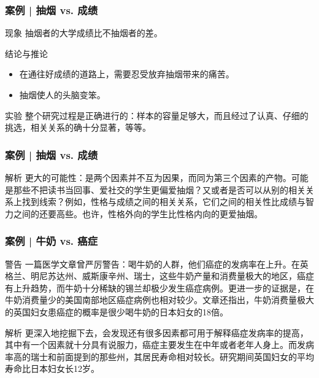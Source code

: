 \begin{frame}
  \frametitle{案例 | 抽烟 vs. 成绩}
  \begin{block}{现象}
    抽烟者的大学成绩比不抽烟者的差。
  \end{block}
  \pause
  \begin{block}{结论与推论}
    \begin{itemize}
      \item 在通往好成绩的道路上，需要忍受放弃抽烟带来的痛苦。
      \item 抽烟使人的头脑变笨。
    \end{itemize}
  \end{block}
  \pause
  \begin{block}{实验}
    整个研究过程是正确进行的：样本的容量足够大，而且经过了认真、仔细的挑选，相关关系的确十分显著，等等。
  \end{block}
\end{frame}

\begin{frame}
  \frametitle{案例 | 抽烟 vs. 成绩}
  \begin{block}{解析}
    更大的可能性：是两个因素并不互为因果，而同为第三个因素的产物。可能是那些不把读书当回事、爱社交的学生更偏爱抽烟？又或者是否可以从别的相关关系上找到线索？例如，性格与成绩之间的相关关系，它们之间的相关性比成绩与智力之间的还要高些。也许，性格外向的学生比性格内向的更爱抽烟。
  \end{block}
\end{frame}

\begin{frame}
  \frametitle{案例 | 牛奶 vs. 癌症}
  \begin{block}{警告}
    一篇医学文章曾严厉警告：喝牛奶的人群，他们癌症的发病率在上升。在英格兰、明尼苏达州、威斯康辛州、瑞士，这些牛奶产量和消费量极大的地区，癌症有上升趋势，而牛奶十分稀缺的锡兰却极少发生癌症病例。更进一步的证据是，在牛奶消费量少的美国南部地区癌症病例也相对较少。文章还指出，牛奶消费量极大的英国妇女患癌症的概率是很少喝牛奶的日本妇女的18倍。
  \end{block}
  \pause \pause \pause \pause
  \begin{block}{解析}
更深入地挖掘下去，会发现还有很多因素都可用于解释癌症发病率的提高，其中有一个因素就十分具有说服力，癌症主要发生在中年或者老年人身上。而发病率高的瑞士和前面提到的那些州，其居民寿命相对较长。研究期间英国妇女的平均寿命比日本妇女长12岁。
  \end{block}
\end{frame}

